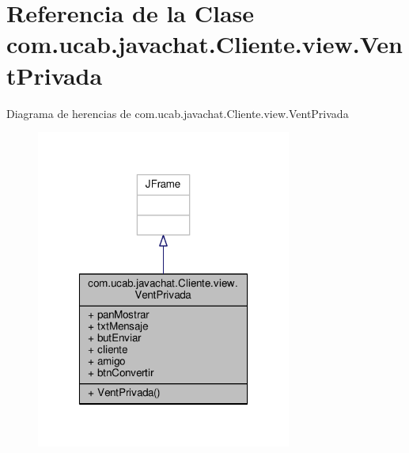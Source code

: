 \hypertarget{classcom_1_1ucab_1_1javachat_1_1_cliente_1_1view_1_1_vent_privada}{\section{Referencia de la Clase com.\-ucab.\-javachat.\-Cliente.\-view.\-Vent\-Privada}
\label{classcom_1_1ucab_1_1javachat_1_1_cliente_1_1view_1_1_vent_privada}
}


Diagrama de herencias de com.\-ucab.\-javachat.\-Cliente.\-view.\-Vent\-Privada\nopagebreak
\begin{figure}[H]
\begin{center}
\leavevmode
\includegraphics[width=238pt]{classcom_1_1ucab_1_1javachat_1_1_cliente_1_1view_1_1_vent_privada__inherit__graph}
\end{center}
\end{figure}


